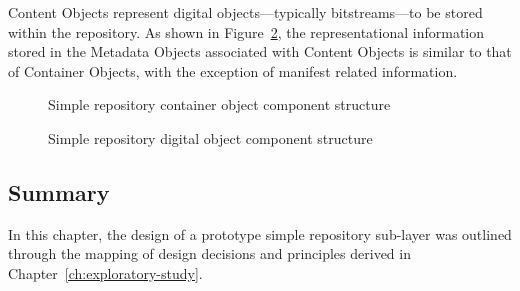 Content Objects represent digital objects---typically bitstreams---to be stored within the repository. As shown in Figure~\ref{fig:design:repository-design:digital-object}, the representational information stored in the Metadata Objects associated with Content Objects is similar to that of Container Objects, with the exception of manifest related information.

\begin{figure}
 \centering
 \framebox[\textwidth]{
 
 }
 \caption{Simple repository container object component structure}
 \label{fig:design:repository-design:container-object}
\end{figure}

\begin{figure}
 \centering
 \framebox[\textwidth]{
 
 }
 \caption{Simple repository digital object component structure}
 \label{fig:design:repository-design:digital-object}
\end{figure}

\subsection{Summary}
\label{sec:implementation:simple-repository:summary}

In this chapter, the design of a prototype simple repository sub-layer was outlined through the mapping of design decisions and principles derived in Chapter~\ref{ch:exploratory-study}.